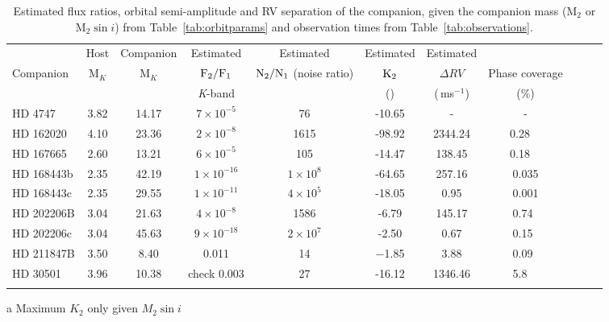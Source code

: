 \begin{table*}
        \small
        \centering
        \caption{Estimated flux ratios, orbital semi-amplitude and RV separation of the companion, given the companion mass (\(\textrm{M}_{2}\) or \(\textrm{M}_{2} \sin{i}\)) from Table~\ref{tab:orbitparams} and observation times from Table~\ref{tab:observations}.} 
        \begin{tabular}{l | c c c c c c c | c c c}%
            \toprule
            & Host& Companion &  Estimated  & Estimated &  Estimated & Estimated &  &    \\  %
            Companion & M$_{K}$ & M$_{K}$ & \(\rm F_{2}/F_{1} \)   & \(\rm N_{2}/N_{1} \) (noise ratio) & \(\rm K_2\) &   \(\Delta RV\) & Phase coverage \\
            & & & \textit{K}-band     & & (\kmps{}) & (\,ms\(^{-1}\)) & (\%) \\
            \midrule
            {HD 4747}        & 3.82 & 14.17 & \(7\times10^{-5} \)   & 76 &  -10.65 & -  &  -  \\  %
            {HD 162020}    & 4.10 & 23.36 & \(2\times10^{-8} \)   & 1615  &  -98.92\tnote{a} &  2344.24     & 0.28~~  \\  %
            {HD 167665}    & 2.60 & 13.21 & \(6\times10^{-5} \)   &  105    &  -14.47\tnote{a}  &   138.45     & 0.18~~  \\  %
            {HD 168443b}  & 2.35 & 42.19 & \(1\times10^{-16} \)  &    \(1\times10^{8} \)   &  -64.65\tnote{a}&   257.16   & 0.035 \\ 
            {HD 168443c}  & 2.35 & 29.55 & \(1\times10^{-11} \)  &   \(4\times10^{5} \)     &  -18.05\tnote{a}  &   0.95   &  0.001 \\  %
            {HD 202206}B  & 3.04& 21.63 & \(4\times10^{-8} \)  &   1586 &  -6.79 & 145.17   & 0.74~  \\  %
            {HD 202206}c   & 3.04& 45.63 & \(9\times10^{-18}\)   &     \(2\times10^{7} \) &   -2.50     &   0.67     &  0.15~  \\  %
            {HD 211847}B  & 3.50 & 8.40 &  0.011 &  14   & $-$1.85 & 3.88   & 0.09~  \\  %
            {HD 30501}      & 3.96 & 10.38 & check 0.003  &  27  &  -16.12    &  1346.46      & 5.8~~  \\
            \bottomrule& & 
            \end{tabular}
    \begin{tablenotes}
        \item[a] {Maximum \(K_2\) only given \(M_2 \sin{i}\)}
      \end{tablenotes}
    \label{tab:estimatedparameters}
\end{table*}